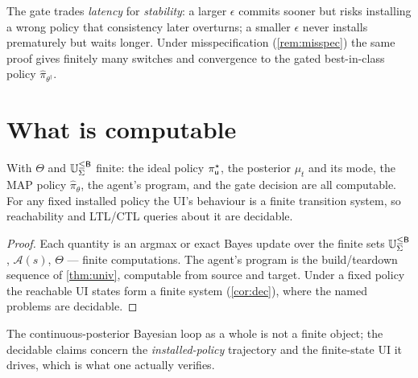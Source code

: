 \documentclass[../uxoxo-main]{subfiles}
\begin{document}
\begin{remark}\label{rem:damping}
The gate trades \emph{latency} for \emph{stability}: a larger $\epsilon$ commits
sooner but risks installing a wrong policy that consistency later overturns; a
smaller $\epsilon$ never installs prematurely but waits longer. Under
misspecification (\cref{rem:misspec}) the same proof gives finitely many
switches and convergence to the gated best-in-class policy $\hat\pi_{\theta^\dagger}$.
\end{remark}

\section{What is computable}\label{sec:decide}
\begin{proposition}[Computability]\label{prop:compute}
With $\Theta$ and $\mathbb{U}_{\Sigma}^{\le \mathsf{B}}$ finite: the ideal policy $\pi^\star_{\mathsf{u}}$, the posterior
$\mu_t$ and its mode, the MAP policy $\hat\pi_\theta$, the agent's program, and
the gate decision are all computable. For any fixed installed policy the UI's
behaviour is a finite transition system, so reachability and LTL/CTL queries
about it are decidable.
\end{proposition}

\begin{proof}
Each quantity is an argmax or exact Bayes update over the finite sets $\mathbb{U}_{\Sigma}^{\le \mathsf{B}}$,
$\mathcal A(s)$, $\Theta$ --- finite computations. The agent's program is the
build/teardown sequence of \cref{thm:univ}, computable from source and target.
Under a fixed policy the reachable UI states form a finite system
(\cref{cor:dec}), where the named problems are decidable.
\end{proof}

The continuous-posterior Bayesian loop as a whole is not a finite object; the
decidable claims concern the \emph{installed-policy} trajectory and the
finite-state UI it drives, which is what one actually verifies.


\end{document}
